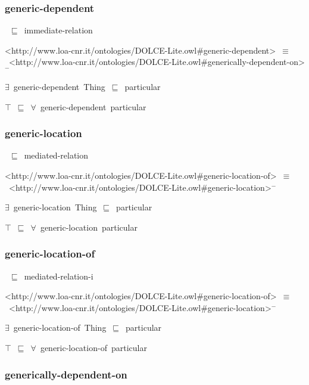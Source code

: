 \documentclass{article}
\begin{document}
\subsubsection*{generic-dependent}

~\ensuremath{\sqsubseteq}~immediate-relation

<http://www.loa-cnr.it/ontologies/DOLCE-Lite.owl#generic-dependent>~\ensuremath{\equiv}~<http://www.loa-cnr.it/ontologies/DOLCE-Lite.owl#generically-dependent-on>\ensuremath{^-}

\ensuremath{\exists}~generic-dependent~Thing~\ensuremath{\sqsubseteq}~particular

\ensuremath{\top}~\ensuremath{\sqsubseteq}~\ensuremath{\forall}~generic-dependent~particular

\subsubsection*{generic-location}

~\ensuremath{\sqsubseteq}~mediated-relation

<http://www.loa-cnr.it/ontologies/DOLCE-Lite.owl#generic-location-of>~\ensuremath{\equiv}~<http://www.loa-cnr.it/ontologies/DOLCE-Lite.owl#generic-location>\ensuremath{^-}

\ensuremath{\exists}~generic-location~Thing~\ensuremath{\sqsubseteq}~particular

\ensuremath{\top}~\ensuremath{\sqsubseteq}~\ensuremath{\forall}~generic-location~particular

\subsubsection*{generic-location-of}

~\ensuremath{\sqsubseteq}~mediated-relation-i

<http://www.loa-cnr.it/ontologies/DOLCE-Lite.owl#generic-location-of>~\ensuremath{\equiv}~<http://www.loa-cnr.it/ontologies/DOLCE-Lite.owl#generic-location>\ensuremath{^-}

\ensuremath{\exists}~generic-location-of~Thing~\ensuremath{\sqsubseteq}~particular

\ensuremath{\top}~\ensuremath{\sqsubseteq}~\ensuremath{\forall}~generic-location-of~particular

\subsubsection*{generically-dependent-on}
\end{document}
